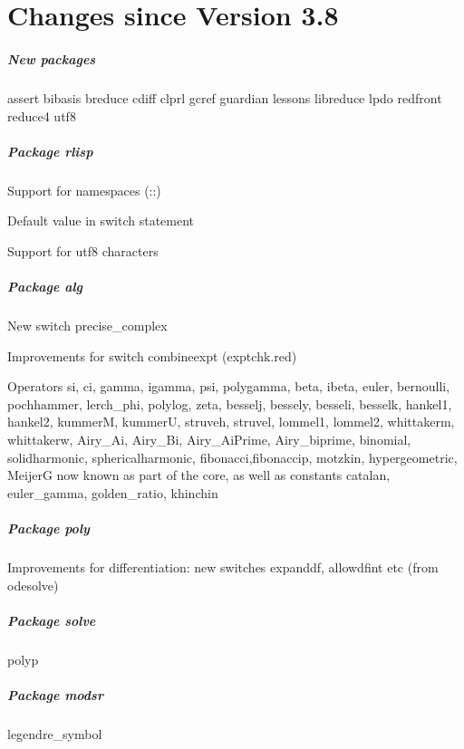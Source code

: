 \chapter{Changes since Version 3.8}

\paragraph*{New packages}

assert
bibasis
breduce
cdiff
clprl
gcref
guardian
lessons
libreduce
lpdo
redfront
reduce4
utf8

\paragraph*{Package rlisp}

Support for namespaces (::)

Default value in switch statement

Support for utf8 characters

\paragraph*{Package alg}

New switch precise\_complex

Improvements for switch combineexpt (exptchk.red)

Operators si, ci, gamma, igamma, psi, polygamma, beta, ibeta, euler,
bernoulli, pochhammer, lerch\_phi, polylog, zeta, 
besselj,
bessely,
besseli,
besselk,
hankel1,
hankel2,
kummerM,
kummerU,
struveh,
struvel,
lommel1,
lommel2,
whittakerm,
whittakerw,
Airy\_Ai,
Airy\_Bi,
Airy\_AiPrime,
Airy\_biprime,
binomial,
solidharmonic,
sphericalharmonic,
fibonacci,fibonaccip,
motzkin,
hypergeometric, MeijerG now known as part of the
core, as well as constants catalan, euler\_gamma, golden\_ratio,
khinchin

\paragraph*{Package poly}

Improvements for differentiation: new switches expanddf, allowdfint etc (from odesolve)

\paragraph*{Package solve}

polyp

\paragraph*{Package modsr}

legendre\_symbol
